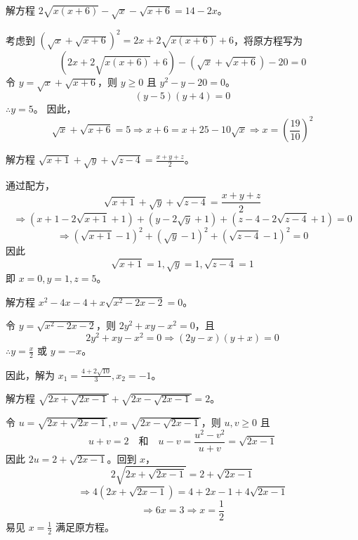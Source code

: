 \begin{questions}
\question
解方程 $2\sqrt{x(x+6)}-\sqrt{x}-\sqrt{x+6}=14-2x$。
\begin{solution}
考虑到 $\left(\sqrt{x}+\sqrt{x+6}\right)^2=2x+2\sqrt{x(x+6)}+6$，将原方程写为
\[
\left(2x+2\sqrt{x(x+6)}+6\right)-\left(\sqrt{x}+\sqrt{x+6}\right)-20=0
\]
令 $y=\sqrt{x}+\sqrt{x+6}$，则 $y \ge 0$ 且 $y^2-y-20=0$。
\[
(y-5)(y+4)=0
\]
$\therefore y=5$。
因此，
\[
\sqrt{x}+\sqrt{x+6}=5 \Rightarrow x+6=x+25-10\sqrt{x} \Rightarrow x=\left(\frac{19}{10}\right)^2
\]
\end{solution}

\question
解方程 $\sqrt{x+1}+\sqrt{y}+\sqrt{z-4}=\frac{x+y+z}{2}$。
\begin{solution}
通过配方，
\[
\sqrt{x+1}+\sqrt{y}+\sqrt{z-4}=\frac{x+y+z}{2}
\]
\[
\Rightarrow (x+1-2\sqrt{x+1}+1)+(y-2\sqrt{y}+1)+(z-4-2\sqrt{z-4}+1)=0
\]
\[
\Rightarrow (\sqrt{x+1}-1)^2+(\sqrt{y}-1)^2+(\sqrt{z-4}-1)^2=0
\]
因此
\[
\sqrt{x+1}=1, \sqrt{y}=1, \sqrt{z-4}=1
\]
即 $x=0, y=1, z=5$。
\end{solution}

\question
解方程 $x^2-4x-4+x\sqrt{x^2-2x-2}=0$。
\begin{solution}
令 $y=\sqrt{x^2-2x-2}$，则 $2y^2+xy-x^2=0$，且
\[
2y^2+xy-x^2=0 \Rightarrow (2y-x)(y+x)=0
\]
$\therefore y=\frac{x}{2}$ 或 $y=-x$。
因此，解为 $x_1=\frac{4+2\sqrt{10}}{3}, x_2=-1$。
\end{solution}

\question
解方程 $\sqrt{2x+\sqrt{2x-1}}+\sqrt{2x-\sqrt{2x-1}}=2$。
\begin{solution}
令 $u=\sqrt{2x+\sqrt{2x-1}}, v=\sqrt{2x-\sqrt{2x-1}}$，则 $u, v \ge 0$ 且
\[
u+v=2 \quad \text{和} \quad u-v=\frac{u^2-v^2}{u+v}=\sqrt{2x-1}
\]
因此 $2u=2+\sqrt{2x-1}$。回到 $x$，
\[
2\sqrt{2x+\sqrt{2x-1}}=2+\sqrt{2x-1}
\]
\[
\Rightarrow 4\left(2x+\sqrt{2x-1}\right)=4+2x-1+4\sqrt{2x-1}
\]
\[
\Rightarrow 6x=3 \Rightarrow x=\frac{1}{2}
\]
易见 $x=\frac{1}{2}$ 满足原方程。
\end{solution}


\end{questions}
